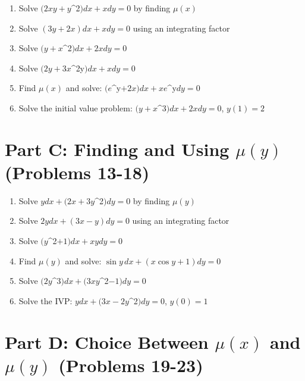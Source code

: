 \documentclass[12pt]{article}
\begin{document}
\begin{enumerate}[start=7]
\item Solve $(2xy + y$^{2}$)dx + xdy = 0$ by finding $\mu(x)$

\item Solve $(3y + 2x)dx + xdy = 0$ using an integrating factor

\item Solve $(y + x$^{2}$)dx + 2xdy = 0$

\item Solve $(2y + 3x$^{2y}$)dx + xdy = 0$

\item Find $\mu(x)$ and solve: $(e$^{y}$ + 2x)dx + xe$^{y}$ dy = 0$

\item Solve the initial value problem: $(y + x$^{3}$)dx + 2xdy = 0$, $y(1) = 2$
\end{enumerate}

\section*{Part C: Finding and Using $\mu(y)$ (Problems 13-18)}

\begin{enumerate}[start=13]
\item Solve $ydx + (2x + 3y$^{2}$)dy = 0$ by finding $\mu(y)$

\item Solve $2ydx + (3x - y)dy = 0$ using an integrating factor

\item Solve $(y$^{2}$ + 1)dx + xydy = 0$

\item Find $\mu(y)$ and solve: $\sin y\,dx + (x\cos y + 1)dy = 0$

\item Solve $(2y$^{3}$)dx + (3xy$^{2}$ - 1)dy = 0$

\item Solve the IVP: $ydx + (3x - 2y$^{2}$)dy = 0$, $y(0) = 1$
\end{enumerate}

\section*{Part D: Choice Between $\mu(x)$ and $\mu(y)$ (Problems 19-23)}
\end{document}
